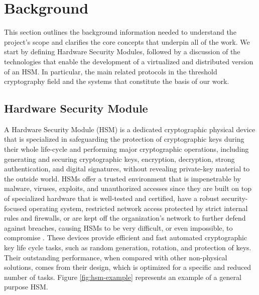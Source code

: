 \chapter{Background} \label{chap:background}

This section outlines the background information needed to understand the project's scope and clarifies the core concepts that underpin all of the work. We start by defining Hardware Security Modules, followed by a discussion of the technologies that enable the development of a virtualized and distributed version of an HSM. In particular, the main related protocols in the threshold cryptography field and the systems that constitute the basis of our work.


\section{Hardware Security Module} \label{sec:hsm}

A Hardware Security Module (HSM) \cite{hsmdefinition} is a dedicated cryptographic physical device that is specialized in safeguarding the protection of cryptographic keys during their whole life-cycle and performing major cryptographic operations, including generating and securing cryptographic keys, encryption, decryption, strong authentication, and digital signatures, without revealing private-key material to the outside world. HSMs offer a trusted environment that is impenetrable by malware, viruses, exploits, and unauthorized accesses since they are built on top of specialized hardware that is well-tested and certified, have a robust security-focused operating system, restricted network access protected by strict internal rules and firewalls, or are kept off the organization's network to further defend against breaches, causing HSMs to be very difficult, or even impossible, to compromise \cite{hsmpen}. These devices provide efficient and fast automated cryptographic key life cycle tasks, such as random generation, rotation, and protection of keys. Their outstanding performance, when compared with other non-physical solutions, comes from their design, which is optimized for a specific and reduced number of tasks. Figure \ref{fig:hsm-example} represents an example of a general purpose HSM.

